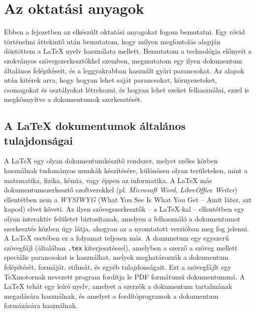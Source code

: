 
\cleardoublepage
\chapter{Az oktatási anyagok}

Ebben a fejezetben az elkészült oktatási anyagokat fogom bemutatni.
Egy rövid történelmi áttekintő után bemutatom, hogy milyen megfontolás alapján
döntöttem a \LaTeX{} nyelv használata mellett. Bemutatom a technológia előnyeit
a szokványos szövegszerkesztőkkel szemben, megmutatom egy ilyen dokumentum
általános felépítéseit, és a leggyakrabban használt gyári parancsokat.
Az alapok után kitérek arra, hogy hogyan lehet saját parancsokat, környezeteket,
csomagokat és osztályokat létrehozni, és hogyan lehet ezeket felhasználni,
ezzel is megkönnyítve a dokumentumok szerkesztését.

\section{A \LaTeX{} dokumentumok általános tulajdonságai}

A \LaTeX{} egy olyan dokumentumkészítő rendszer, melyet széles körben használnak
tudományos munkák készítésére, különösen olyan területeken, mint a matematika,
fizika, kémia, vagy éppen az informatika. A \LaTeX{} más dokumentumszerkesztő
szoftverekkel (pl. \textit{Microsoft Word}, \textit{LibreOffice Writer})
ellentétben nem a \textit{WYSIWYG} (What You See Is What You Get -- Amit látsz,
azt kapod) elvet követi. Az ilyen szövegszerkesztők -- a \LaTeX{}-kal
-- ellentétben egy olyan interaktív felületet biztosítanak, amelyen a
felhasználó a dokumentumot szerkesztés közben úgy látja, ahogyan az a nyomtatott
verzióban meg fog jelenni. A \LaTeX{} esetében ez a folyamat teljesen más. A
domunetum egy egyszerű szövegfájl (általában \texttt{.tex} kiterjesztéssel),
amelyben a szerző a szöveg mellett speciális parancsokat is használhat, melyek
meghatározzák a dokumentum felépítését, formáját, stílusát, és egyéb
tulajdonságait. Ezt a szövegfájlt egy \TeX motornak nevezett program fordítja
le PDF formátumú dokumentummá. A \LaTeX{} tehát egy leíró nyelv, amelyet a
szerzők a dokumentum tartalmának megadására használnak, és amelyet a
fordítóprogramok a dokumentum formázására használnak. \cite{overleaf_30}

